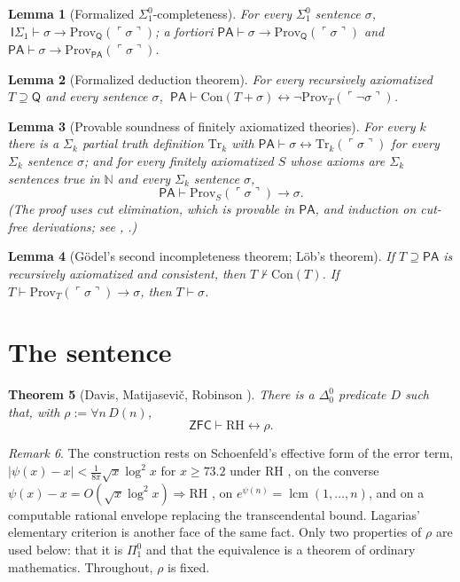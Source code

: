 \documentclass[11pt]{article}
\newtheorem{theorem}{Theorem}[section]
\newtheorem{lemma}[theorem]{Lemma}
\theoremstyle{definition}
\theoremstyle{remark}
\newtheorem{remark}[theorem]{Remark}
\newcommand{\N}{\mathbb N}
\newcommand{\PA}{\mathsf{PA}}
\newcommand{\ZFC}{\mathsf{ZFC}}
\newcommand{\RA}{\mathsf{Q}}
\newcommand{\ISig}{\mathsf{I}\Sigma_1}
\newcommand{\Prov}{\mathrm{Prov}}
\newcommand{\Con}{\mathrm{Con}}
\newcommand{\Tr}{\mathrm{Tr}}
\newcommand{\RH}{\mathrm{RH}}
\newcommand{\gn}[1]{\ulcorner #1\urcorner}
\newcommand{\Pione}{\Pi^0_1}
\newcommand{\Sigone}{\Sigma^0_1}
\newcommand{\Dzero}{\Delta^0_0}
\DeclareMathOperator{\lcm}{lcm}
\begin{document}
\begin{lemma}[Formalized $\Sigone$-completeness]\label{lem:provsigma}
For every $\Sigone$ sentence $\sigma$, $\ \ISig\vdash\sigma\to\Prov_\RA(\gn\sigma)$; a fortiori $\PA\vdash\sigma\to\Prov_\RA(\gn\sigma)$ and $\PA\vdash\sigma\to\Prov_\PA(\gn\sigma)$.
\end{lemma}

\begin{lemma}[Formalized deduction theorem]\label{lem:ded}
For every recursively axiomatized $T\supseteq\RA$ and every sentence $\sigma$, $\ \PA\vdash\Con(T+\sigma)\leftrightarrow\neg\Prov_T(\gn{\neg\sigma})$.
\end{lemma}

\begin{lemma}[Provable soundness of finitely axiomatized theories]\label{lem:refl}
For every $k$ there is a $\Sigma_k$ partial truth definition $\Tr_k$ with $\PA\vdash\sigma\leftrightarrow\Tr_k(\gn\sigma)$ for every $\Sigma_k$ sentence $\sigma$; and for every finitely axiomatized $S$ whose axioms are $\Sigma_k$ sentences true in $\N$ and every $\Sigma_k$ sentence $\sigma$,
\[
\PA\vdash\Prov_S(\gn\sigma)\to\sigma .
\]
(The proof uses cut elimination, which is provable in $\PA$, and induction on cut-free derivations; see \cite[Chapter III]{HP}, \cite[Chapter 2]{Lindstrom}.)
\end{lemma}

\begin{lemma}[G\"odel's second incompleteness theorem; L\"ob's theorem]\label{lem:g2}
If $T\supseteq\PA$ is recursively axiomatized and consistent, then $T\nvdash\Con(T)$. If $T\vdash\Prov_T(\gn\sigma)\to\sigma$, then $T\vdash\sigma$.
\end{lemma}

\section{The sentence}

\begin{theorem}[Davis, Matijasevi\v{c}, Robinson \cite{DMR}]\label{thm:form}
There is a $\Dzero$ predicate $D$ such that, with $\rho:=\forall n\,D(n)$,
\[
\ZFC\vdash\RH\leftrightarrow\rho .
\]
\end{theorem}

\begin{remark}
The construction rests on Schoenfeld's effective form of the error term, $|\psi(x)-x|<\frac1{8\pi}\sqrt x\log^2x$ for $x\ge73.2$ under $\RH$ \cite{Schoenfeld}, on the converse $\psi(x)-x=O(\sqrt x\log^2x)\Rightarrow\RH$ \cite[\S14]{Titchmarsh}, on $e^{\psi(n)}=\lcm(1,\dots,n)$, and on a computable rational envelope replacing the transcendental bound. Lagarias' elementary criterion \cite{Lagarias} is another face of the same fact. Only two properties of $\rho$ are used below: that it is $\Pione$ and that the equivalence is a theorem of ordinary mathematics. Throughout, $\rho$ is fixed.
\end{remark}
\end{document}
